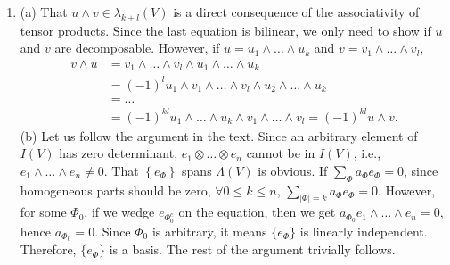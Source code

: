 \begin{enumerate}
If $a_{1} \neq 0, b_{3}=\frac{b_{1} a_{3}}{a_{1}}, b_{4}=\frac{b_{1} a_{4}}{a_{1}}$, which also contradicts $a_{3} b_{4}-b_{3} a_{4}=1$.

(d) No. Let $\alpha=e_{1} \wedge e_{2}+e_{3} \wedge e_{4} \in \Lambda_{2}(\mathbb{R}^{4})$. 
Then $\alpha \wedge \alpha=2 e_{1} \wedge e_{2} \wedge e_{3} \wedge e_{4} \in \Lambda_{4}(\mathbb{R}^{4})$, which is not zero.
\item (a) That $u \wedge v \in \lambda_{k+l}(V)$ is a direct consequence of the associativity of tensor products. 
Since the last equation is bilinear, we only need to show if $u$ and $v$ are decomposable. 
However, if $u=u_{1} \wedge \ldots \wedge u_{k}$ and $v=v_{1} \wedge \ldots \wedge v_{l}$,
\begin{align*}
v \wedge u&=v_{1} \wedge \ldots \wedge v_{l} \wedge u_{1} \wedge \ldots \wedge u_{k}\\
&=(-1)^{l} u_{1} \wedge v_{1} \wedge \ldots \wedge v_{l} \wedge u_{2} \wedge \ldots \wedge u_{k}\\
&=\ldots\\
&=(-1)^{kl} u_{1} \wedge \ldots \wedge u_{k} \wedge v_{1} \wedge \ldots \wedge v_{l}=(-1)^{kl} u \wedge v.
\end{align*}
(b) Let us follow the argument in the text. 
Since an arbitrary element of $I(V)$ has zero determinant, 
$e_{1} \otimes \ldots \otimes e_{n}$ cannot be in $I(V)$, 
i.e., $e_{1} \wedge \ldots \wedge e_{n} \neq 0$. 
That $\left\{e_{\Phi}\right\}$ spans $\Lambda(V)$ is obvious. 
If $\sum_{\Phi} a_{\Phi} e_{\Phi}=0$, since homogeneous parts should be zero, 
$\forall 0 \leq k \leq n$, $\sum_{|\Phi|=k} a_{\Phi} e_{\Phi}=0$. 
However, for some $\Phi_{0}$, if we wedge $e_{\Phi_{0}^{c}}$ on the equation, 
then we get $a_{\Phi_{0}} e_{1} \wedge \ldots \wedge e_{n}=0$, hence $a_{\Phi_{0}}=0$. 
Since $\Phi_{0}$ is arbitrary, it means $\{e_{\Phi}\}$ is linearly independent. 
Therefore, $\{e_{\Phi}\}$ is a basis. The rest of the argument trivially follows.


\end{enumerate}

